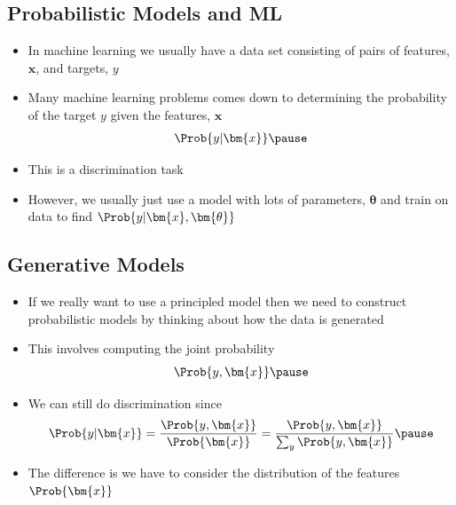 
\begin{slide}
\section{Probabilistic Models and ML}

\begin{PauseHighLight}
  \begin{itemize}
  \item In machine learning we usually have a data set consisting of
    pairs of features, $\bm{x}$, and targets, $y$\pause
  \item Many machine learning problems comes down to determining the
    probability of the target $y$ given the features, $\bm{x}$
    \begin{align*}
      \Prob{y | \bm{x}}\pause
    \end{align*}
  \item This is a discrimination task\pause
  \item However, we usually just use a model with lots of parameters,
    $\bm{\theta}$ and train on data to find $\Prob{y|\bm{x},\bm{\theta}}$\pause
  \end{itemize}
\end{PauseHighLight}

\end{slide}


\begin{slide}
\section[-2]{Generative Models}

\begin{PauseHighLight}
  \begin{itemize}
  \item If we really want to use a principled model then we need to
    construct probabilistic models by thinking about how the data is
    generated\pause
  \item This involves computing the joint probability
    \begin{align*}
      \Prob{y,\bm{x}}\pause
    \end{align*}
  \item We can still do discrimination since
    \begin{align*}
      \Prob{y|\bm{x}} = \frac{\Prob{y,\bm{x}}}{\Prob{\bm{x}}} 
      = \frac{\Prob{y,\bm{x}}}{\sum_y \Prob{y,\bm{x}}}\pause 
    \end{align*}
  \item The difference is we have to consider the distribution of the
    features $\Prob{\bm{x}}$\pause
  \end{itemize}
\end{PauseHighLight}

\end{slide}

